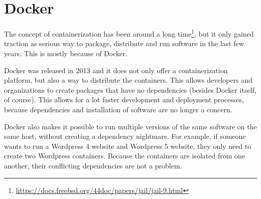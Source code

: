 \section{Docker}\label{background:docker}
The concept of containerization has been around a long time\footnote{\url{https://docs.freebsd.org/44doc/papers/jail/jail-9.html}}, but it only gained traction as serious way to package, distribute and run software in the last few years. This is mostly because of Docker.

\medskip

Docker was released in 2013 and it does not only offer a containerization platform, but also a way to distribute the containers. This allows developers and organizations to create packages that have no dependencies (besides Docker itself, of course). This allows for a lot faster development and deployment processes, because dependencies and installation of software are no longer a concern.

\medskip

Docker also makes it possible to run multiple versions of the same software on the same host, without creating a dependency nightmare. For example, if someone wants to run a Wordpress 4 website and Wordpress 5 website, they only need to create two Wordpress containers. Because the containers are isolated from one another, their conflicting dependencies are not a problem.









